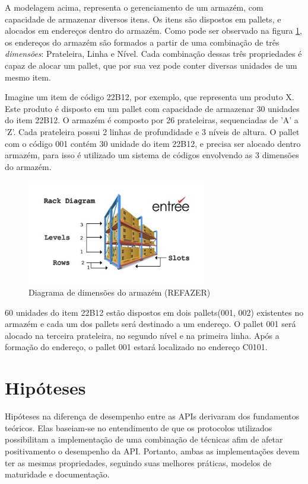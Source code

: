 A modelagem acima, representa o gerenciamento de um armazém, com capacidade de armazenar diversos itens. Os itens são dispostos em pallets, e alocados em endereços dentro do armazém. Como pode ser observado na figura \ref{fig:rack}, os endereços do armazém são formados a partir de uma combinação de três \textit{dimensões}: Prateleira, Linha e Nível. Cada combinação dessas três propriedades é capaz de alocar um pallet, que por sua vez pode conter diversas unidades de um mesmo item.

Imagine um item de código 22B12, por exemplo, que representa um produto X. Este produto é disposto em um pallet com capacidade de armazenar 30 unidades do item 22B12. O armazém é composto por 26 prateleiras, sequenciadas de 'A' a 'Z'. Cada prateleira possui 2 linhas de profundidade e  3 níveis de altura. O pallet com o código 001 contém 30 unidade do item 22B12, e precisa ser alocado dentro armazém, para isso é utilizado um sistema de códigos envolvendo as 3 dimensões do armazém.


\begin{figure}[htbp]
\centering
\includegraphics[width=0.7\textwidth]{figuras/rack.jpg}
\caption{Diagrama de dimensões do armazém (REFAZER)}
\label{fig:rack}
\author{fonte: Autor}
\end{figure}

60 unidades do item 22B12 estão dispostos em dois pallets(001, 002) existentes no armazém e cada um dos pallets será destinado a um endereço. O pallet 001 será alocado na terceira prateleira, no segundo nível e na primeira linha. Após a formação do endereço, o pallet 001 estará localizado no endereço C0101.  

\section{Hipóteses} \label{sechHipóteses}

Hipóteses na diferença de desempenho entre as APIs derivaram dos fundamentos teóricos. Elas baseiam-se no entendimento de que os protocolos utilizados possibilitam a implementação de uma combinação de técnicas afim de afetar positivamento o desempenho da API. Portanto, ambas as implementações devem ter as mesmas propriedades, seguindo suas melhores práticas, modelos de maturidade e documentação.

